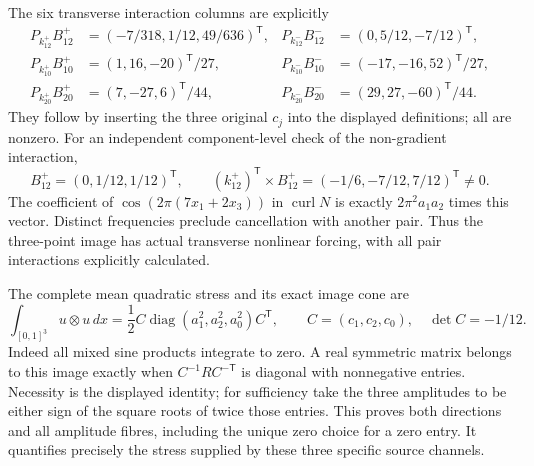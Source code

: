 The six transverse interaction columns are explicitly
\begin{align*}
 P_{k_{12}^+}B_{12}^+&=(-7/318,1/12,49/636)^{\mathsf T},&
 P_{k_{12}^-}B_{12}^-&=(0,5/12,-7/12)^{\mathsf T},\\
 P_{k_{10}^+}B_{10}^+&=(1,16,-20)^{\mathsf T}/27,&
 P_{k_{10}^-}B_{10}^-&=(-17,-16,52)^{\mathsf T}/27,\\
 P_{k_{20}^+}B_{20}^+&=(7,-27,6)^{\mathsf T}/44,&
 P_{k_{20}^-}B_{20}^-&=(29,27,-60)^{\mathsf T}/44.
\end{align*}
They follow by inserting the three original $c_j$ into the displayed
definitions; all are nonzero. For an independent component-level
check of the non-gradient interaction,
\[
 B_{12}^+=(0,1/12,1/12)^{\mathsf T},\qquad
 (k_{12}^+)^{\mathsf T}\times B_{12}^+
                 =(-1/6,-7/12,7/12)^{\mathsf T}\ne0.
\]
The coefficient of $\cos(2\pi(7x_1+2x_3))$ in $\operatorname{curl}N$
is exactly $2\pi^2a_1a_2$ times this vector. Distinct frequencies
preclude cancellation with another pair. Thus the three-point image
has actual transverse nonlinear forcing, with all pair interactions
explicitly calculated.

The complete mean quadratic stress and its exact image cone are
\begin{equation}
 \int_{[0,1]^3}u\otimes u\,dx
 =\frac12 C\operatorname{diag}(a_1^2,a_2^2,a_0^2)C^{\mathsf T},
 \qquad C=(c_1,c_2,c_0),\quad\det C=-1/12.
 \label{s6f:stress}
\end{equation}
Indeed all mixed sine products integrate to zero. A real symmetric
matrix belongs to this image exactly when
$C^{-1}RC^{-\mathsf T}$ is diagonal with nonnegative entries.
Necessity is the displayed identity; for sufficiency take the three
amplitudes to be either sign of the square roots of twice those
entries. This proves both directions and all amplitude fibres,
including the unique zero choice for a zero entry. It quantifies
precisely the stress supplied by these three specific source channels.


